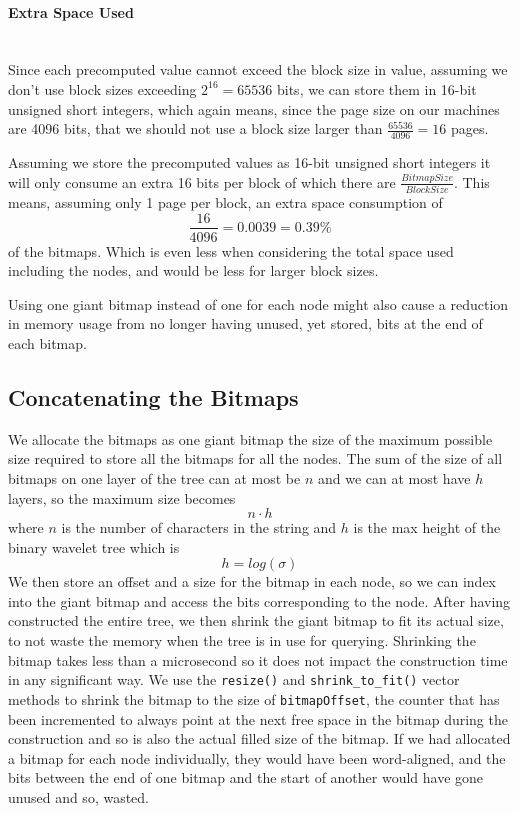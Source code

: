 \paragraph{Extra Space Used}~\\
Since each precomputed value cannot exceed the block size in value, assuming we don't use block sizes exceeding $2^{16} = 65536$ bits, we can store them in 16-bit unsigned short integers, which again means, since the page size on our machines are 4096 bits, that we should not use a block size larger than $\frac{65536}{4096} = 16$ pages.

Assuming we store the precomputed values as 16-bit unsigned short integers it will only consume an extra 16 bits per block of which there are $\frac{BitmapSize}{BlockSize}$.
This means, assuming only 1 page per block, an extra space consumption of
\[ \frac{16}{4096} = 0.0039 = 0.39\% \]
of the bitmaps.
Which is even less when considering the total space used including the nodes, and would be less for larger block sizes.

Using one giant bitmap instead of one for each node might also cause a reduction in memory usage from no longer having unused, yet stored, bits at the end of each bitmap.




\subsection{Concatenating the Bitmaps}
We allocate the bitmaps as one giant bitmap the size of the maximum possible size required to store all the bitmaps for all the nodes. The sum of the size of all bitmaps on one layer of the tree can at most be $n$ and we can at most have $h$ layers, so the maximum size becomes
\[n \cdot h\]
where $n$ is the number of characters in the string and $h$ is the max height of the binary wavelet tree which is
\[ h = log(\sigma) \]
We then store an offset and a size for the bitmap in each node, so we can index into the giant bitmap and access the bits corresponding to the node.
After having constructed the entire tree, we then shrink the giant bitmap to fit its actual size, to not waste the memory when the tree is in use for querying. Shrinking the bitmap takes less than a microsecond so it does not impact the construction time in any significant way. We use the \texttt{resize()} and \texttt{shrink\_to\_fit()} vector methods to shrink the bitmap to the size of \texttt{bitmapOffset}, the counter that has been incremented to always point at the next free space in the bitmap during the construction and so is also the actual filled size of the bitmap.
If we had allocated a bitmap for each node individually, they would have been word-aligned, and the bits between the end of one bitmap and the start of another would have gone unused and so, wasted.

